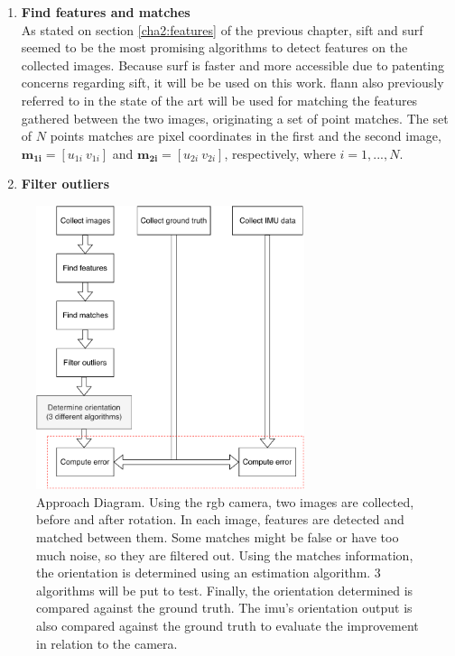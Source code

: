 \begin{enumerate}
	\item \textbf{Find features and matches}\\
	As stated on section \ref{cha2:features} of the previous chapter,
	\acrshort{sift} and \acrshort{surf} seemed to be the most promising algorithms to detect features on the collected images. Because \acrshort{surf} is faster and more accessible due to patenting concerns regarding \acrshort{sift}, it will be be used on this work.
	\acrshort{flann} also previously referred to in the state of the art will be used for matching the features gathered between the two images, originating a set of point matches. The set of $N$ points matches are pixel coordinates in the first and the second image, $\mathbf{m_{1i}} = [u_{1i} \ v_{1i}]$ and $\mathbf{m_{2i}} = [u_{2i} \ v_{2i}]$, respectively, where $i=1,...,N$.
	
	\item \textbf{Filter outliers}\\
	
	
\end{enumerate}


\begin{figure}[ht]
	\centering
	\includegraphics[width=0.7\textwidth]{images/approach.pdf}
	\caption[Approach Diagram]{Approach Diagram. Using the \acrshort{rgb} camera, two images are collected, before and after rotation. In each image, features are detected and matched between them. Some matches might be false or have too much noise, so they are filtered out. Using the matches information, the orientation is determined using an estimation algorithm. 3 algorithms will be put to test. Finally, the orientation determined is compared against the ground truth. The \acrshort{imu}'s orientation output is also compared against the ground truth to evaluate the improvement in relation to the camera.}
	\label{cha3:methodology:approach}
\end{figure}


